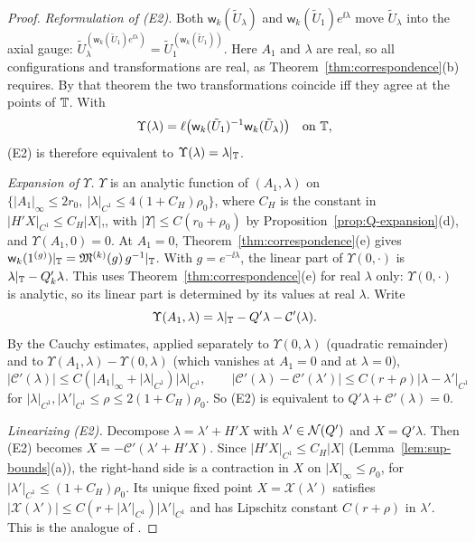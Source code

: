 \begin{proof}
\emph{Reformulation of (E2).} Both $\mathsf w_k(\tilde U_\lambda)$ and $\mathsf w_k(\tilde U_1)e^{\ii\lambda}$ move $\tilde U_\lambda$ into the axial gauge: $\tilde U_\lambda^{(\mathsf w_k(\tilde U_1)e^{\ii\lambda})}=\tilde U_1^{(\mathsf w_k(\tilde U_1))}$. Here $A_1$ and $\lambda$ are real, so all configurations and transformations are real, as Theorem~\ref{thm:correspondence}(b) requires. By that theorem the two transformations coincide iff they agree at the points of $\mathbb T$. With
\[
\Upsilon(\lambda)=\ell\big(\mathsf w_k(\tilde U_1)^{-1}\mathsf w_k(\tilde U_\lambda)\big)\quad\text{on }\mathbb T,
\]
(E2) is therefore equivalent to $\Upsilon(\lambda)=\lambda|_\mathbb T$.

\emph{Expansion of $\Upsilon$.} $\Upsilon$ is an analytic function of $(A_1,\lambda)$ on $\{|A_1|_\infty\le2r_0,\ |\lambda|_{C^1}\le4(1+C_H)\rho_0\}$, where $C_H$ is the constant in $|H'X|_{C^1}\le C_H|X|$,, with $|\Upsilon|\le C(r_0+\rho_0)$ by Proposition~\ref{prop:Q-expansion}(d), and $\Upsilon(A_1,0)=0$. At $A_1=0$, Theorem~\ref{thm:correspondence}(e) gives $\mathsf w_k(1^{(g)})|_\mathbb T=\mathfrak M^{(k)}(g)\,g^{-1}|_\mathbb T$. With $g=e^{-\ii\lambda}$, the linear part of $\Upsilon(0,\cdot)$ is $\lambda|_\mathbb T-Q'_k\lambda$. This uses Theorem~\ref{thm:correspondence}(e) for real $\lambda$ only: $\Upsilon(0,\cdot)$ is analytic, so its linear part is determined by its values at real $\lambda$. Write
\[
\Upsilon(A_1,\lambda)=\lambda|_\mathbb T-Q'\lambda-\mathcal C'(\lambda).
\]
By the Cauchy estimates, applied separately to $\Upsilon(0,\lambda)$ (quadratic remainder) and to $\Upsilon(A_1,\lambda)-\Upsilon(0,\lambda)$ (which vanishes at $A_1=0$ and at $\lambda=0$),
\[
|\mathcal C'(\lambda)|\le C(|A_1|_\infty+|\lambda|_{C^1})|\lambda|_{C^1},\qquad|\mathcal C'(\lambda)-\mathcal C'(\lambda')|\le C(r+\rho)|\lambda-\lambda'|_{C^1}
\]
for $|\lambda|_{C^1},|\lambda'|_{C^1}\le\rho\le2(1+C_H)\rho_0$. So (E2) is equivalent to $Q'\lambda+\mathcal C'(\lambda)=0$.

\emph{Linearizing (E2).} Decompose $\lambda=\lambda'+H'X$ with $\lambda'\in\mathcal N(Q')$ and $X=Q'\lambda$. Then (E2) becomes $X=-\mathcal C'(\lambda'+H'X)$. Since $|H'X|_{C^1}\le C_H|X|$ (Lemma~\ref{lem:sup-bounds}(a)), the right-hand side is a contraction in $X$ on $|X|_\infty\le\rho_0$, for $|\lambda'|_{C^1}\le(1+C_H)\rho_0$. Its unique fixed point $X=\mathcal X(\lambda')$ satisfies $|\mathcal X(\lambda')|\le C(r+|\lambda'|_{C^1})|\lambda'|_{C^1}$ and has Lipschitz constant $C(r+\rho)$ in $\lambda'$. This is the analogue of \cite[Sect.~E]{BalReg}.


\end{proof}
